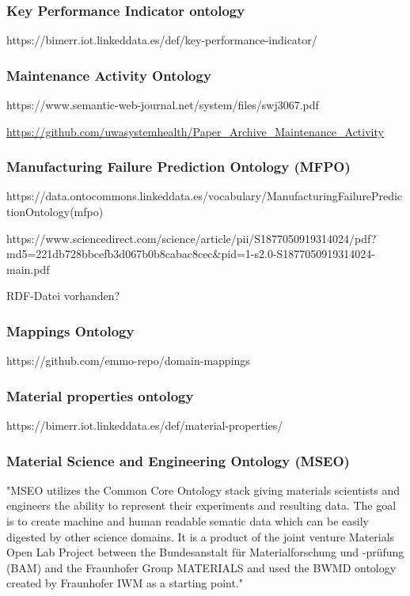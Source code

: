 \documentclass{article}
\begin{document}
\subsubsection{Key Performance Indicator ontology}

https://bimerr.iot.linkeddata.es/def/key-performance-indicator/

\subsubsection{Maintenance Activity Ontology}

https://www.semantic-web-journal.net/system/files/swj3067.pdf

\url{https://github.com/uwasystemhealth/Paper_Archive_Maintenance_Activity}

\subsubsection{Manufacturing Failure Prediction Ontology (MFPO)}

https://data.ontocommons.linkeddata.es/vocabulary/ManufacturingFailurePredictionOntology(mfpo)

https://www.sciencedirect.com/science/article/pii/S1877050919314024/pdf?md5=221db728bbcefb3d067b0b8cabac8cec\&pid=1-s2.0-S1877050919314024-main.pdf

RDF-Datei vorhanden?

\subsubsection{Mappings Ontology}

https://github.com/emmo-repo/domain-mappings

\subsubsection{Material properties ontology}

https://bimerr.iot.linkeddata.es/def/material-properties/

\subsubsection{Material Science and Engineering Ontology (MSEO)}

"MSEO utilizes the Common Core Ontology stack giving materials scientists and engineers the ability to represent their experiments and resulting data. The goal is to create machine and human readable sematic data which can be easily digested by other science domains. It is a product of the joint venture Materials Open Lab Project between the Bundesanstalt für Materialforschung und -prüfung (BAM) and the Fraunhofer Group MATERIALS and used the BWMD ontology created by Fraunhofer IWM as a starting point."
\end{document}

